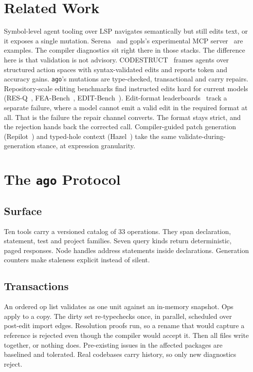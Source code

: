 \documentclass[11pt]{article}
\begin{document}
\section{Related Work}
Symbol-level agent tooling over LSP navigates semantically but still
edits text, or it exposes a single mutation. Serena~\cite{serena} and
gopls's experimental MCP server~\cite{goplsmcp} are examples. The
compiler diagnostics sit right there in those stacks. The difference
here is that validation is not advisory. CODESTRUCT~\cite{codestruct}
frames agents over structured action spaces with syntax-validated edits and reports token and accuracy gains. \texttt{ago}'s mutations
are type-checked, transactional and carry repairs. Repository-scale
editing benchmarks find instructed edits hard for current models
(RES-Q~\cite{resq}, FEA-Bench~\cite{feabench},
EDIT-Bench~\cite{editbench}). Edit-format leaderboards~\cite{aider}
track a separate failure, where a model cannot emit a valid edit in the
required format at all. That is the failure the repair channel converts.
The format stays strict, and the rejection hands back the corrected
call. Compiler-guided patch generation (Repilot~\cite{repilot}) and
typed-hole context (Hazel~\cite{hazel}) take the same
validate-during-generation stance, at expression granularity.

\section{The \texttt{ago} Protocol}
\subsection{Surface}
Ten tools carry a versioned catalog of 33 operations. They span
declaration, statement, test and project families. Seven query kinds
return deterministic, paged responses. Node handles address statements
inside declarations. Generation counters make staleness explicit
instead of silent.
\subsection{Transactions}
An ordered op list validates as one unit against an in-memory snapshot.
Ops apply to a copy. The dirty set re-typechecks once, in parallel,
scheduled over post-edit import edges. Resolution proofs run, so a
rename that would capture a reference is rejected even though the
compiler would accept it. Then all files write together, or nothing
does. Pre-existing issues in the affected packages are baselined and
tolerated. Real codebases carry history, so only new diagnostics reject.
\end{document}
